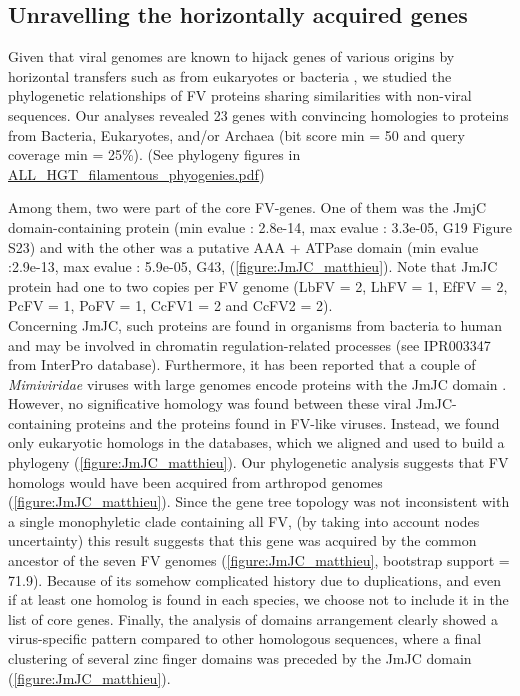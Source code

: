 \subsection{Unravelling the horizontally acquired genes}

Given that viral genomes are known to hijack genes of various origins by horizontal transfers such as from eukaryotes or bacteria \citep{irwin_systematic_2022, filee_phylogenetic_2008}, we studied the phylogenetic relationships of FV  proteins  sharing similarities with non-viral sequences. Our analyses revealed 23 genes with convincing homologies to proteins from Bacteria, Eukaryotes, and/or Archaea (bit score min = 50 and query coverage min = 25\%). (See phylogeny figures in \href{https://github.com/BenjaminGuinet/PhD_defense/blob/main/Supplementary_paper2/ALL_HGT_filamentous_phyogenies.pdf}{ALL\_HGT\_filamentous\_phyogenies.pdf})

Among them, two were part of the core FV-genes. One of them was the JmjC domain-containing protein (min evalue : 2.8e-14, max evalue : 3.3e-05, G19 Figure S23) and with the other was a putative AAA + ATPase domain (min evalue :2.9e-13, max evalue : 5.9e-05, G43, (\figurename{\ref{figure:JmJC_matthieu}}). Note that JmJC protein had one to two copies per FV genome (LbFV = 2, LhFV = 1, EfFV = 2, PcFV = 1, PoFV = 1, CcFV1 = 2 and CcFV2 = 2).  \\

Concerning JmJC, such proteins are found in organisms from bacteria to human and may be involved in chromatin regulation-related processes (see IPR003347 from InterPro database). Furthermore, it has been reported that a couple of \textit{Mimiviridae} viruses with large genomes encode proteins with the JmJC domain \citep{colson_viruses_2011}. However, no significative homology was found between these viral JmJC-containing proteins and the proteins found in FV-like viruses. Instead, we found only eukaryotic homologs in the databases, which we aligned and used to build a phylogeny (\figurename{\ref{figure:JmJC_matthieu}}). Our phylogenetic analysis suggests that FV homologs would  have been acquired from arthropod genomes (\figurename{\ref{figure:JmJC_matthieu}}). Since the gene tree topology was not inconsistent with a single monophyletic clade containing all FV, (by taking  into account nodes uncertainty) this result suggests that this gene was acquired by the common ancestor of the seven FV genomes (\figurename{\ref{figure:JmJC_matthieu}}, bootstrap support = 71.9). Because of its somehow complicated history due to duplications, and even if at least one homolog is found in each species, we choose not to include it in the list of core genes. Finally, the analysis of domains arrangement clearly showed a virus-specific pattern compared to other homologous sequences, where a final clustering of several zinc finger domains was preceded by the JmJC domain (\figurename{\ref{figure:JmJC_matthieu}}).\\  


